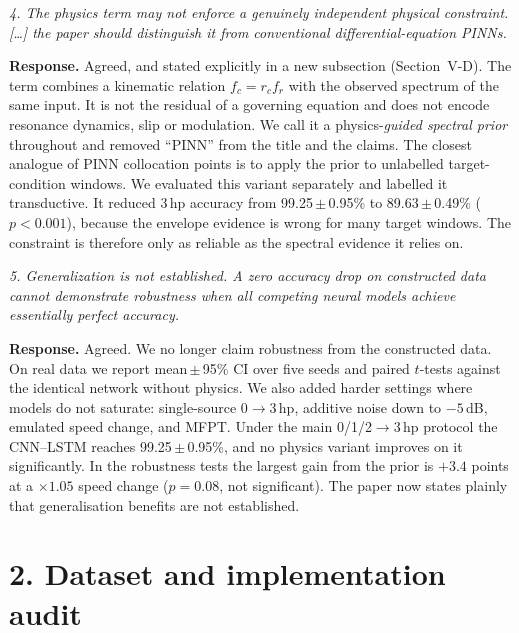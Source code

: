 \documentclass[11pt]{article}
\newenvironment{comment}{\par\medskip\noindent\begin{minipage}{\linewidth}\itshape\color{black!70}}{\end{minipage}\par\smallskip}
\begin{document}
\begin{comment}
4. The physics term may not enforce a genuinely independent physical constraint.
[\dots] the paper should distinguish it from conventional differential-equation PINNs.
\end{comment}
\textbf{Response.} Agreed, and stated explicitly in a new subsection
(Section~V-D). The term combines a kinematic relation $f_c=r_c f_r$ with the
observed spectrum of the same input. It is not the residual of a governing
equation and does not encode resonance dynamics, slip or modulation. We call it
a physics-\emph{guided spectral prior} throughout and removed ``PINN'' from the
title and the claims. The closest analogue of PINN collocation points is to apply
the prior to unlabelled target-condition windows. We evaluated this variant
separately and labelled it transductive. It reduced 3\,hp accuracy from
99.25\,$\pm$\,0.95\% to 89.63\,$\pm$\,0.49\% ($p<0.001$), because the envelope
evidence is wrong for many target windows. The constraint is therefore only as
reliable as the spectral evidence it relies on.

\begin{comment}
5. Generalization is not established. A zero accuracy drop on constructed data
cannot demonstrate robustness when all competing neural models achieve
essentially perfect accuracy.
\end{comment}
\textbf{Response.} Agreed. We no longer claim robustness from the constructed
data. On real data we report mean\,$\pm$\,95\% CI over five seeds and paired
$t$-tests against the identical network without physics. We also added harder
settings where models do not saturate: single-source 0$\to$3\,hp, additive noise
down to $-5$\,dB, emulated speed change, and MFPT. Under the main 0/1/2$\to$3\,hp
protocol the CNN--LSTM reaches 99.25\,$\pm$\,0.95\%, and no physics variant
improves on it significantly. In the robustness tests the largest gain from the
prior is $+3.4$ points at a $\times1.05$ speed change ($p=0.08$, not significant).
The paper now states plainly that generalisation benefits are not established.

\section*{2. Dataset and implementation audit}
\end{document}
